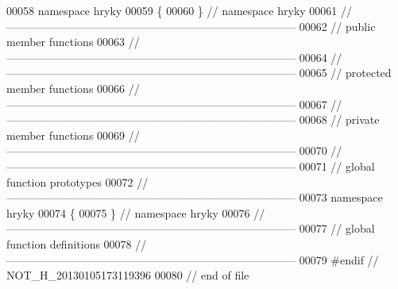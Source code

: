 \begin{DoxyCode}
00058 \textcolor{keyword}{namespace }hryky
00059 \{
00060 \} \textcolor{comment}{// namespace hryky}
00061 \textcolor{comment}{//
      ------------------------------------------------------------------------------}
00062 \textcolor{comment}{// public member functions}
00063 \textcolor{comment}{//
      ------------------------------------------------------------------------------}
00064 \textcolor{comment}{//
      ------------------------------------------------------------------------------}
00065 \textcolor{comment}{// protected member functions}
00066 \textcolor{comment}{//
      ------------------------------------------------------------------------------}
00067 \textcolor{comment}{//
      ------------------------------------------------------------------------------}
00068 \textcolor{comment}{// private member functions}
00069 \textcolor{comment}{//
      ------------------------------------------------------------------------------}
00070 \textcolor{comment}{//
      ------------------------------------------------------------------------------}
00071 \textcolor{comment}{// global function prototypes}
00072 \textcolor{comment}{//
      ------------------------------------------------------------------------------}
00073 \textcolor{keyword}{namespace }hryky
00074 \{
00075 \} \textcolor{comment}{// namespace hryky}
00076 \textcolor{comment}{//
      ------------------------------------------------------------------------------}
00077 \textcolor{comment}{// global function definitions}
00078 \textcolor{comment}{//
      ------------------------------------------------------------------------------}
00079 \textcolor{preprocessor}{#endif // NOT\_H\_20130105173119396}
00080 \textcolor{preprocessor}{}\textcolor{comment}{// end of file}
\end{DoxyCode}
